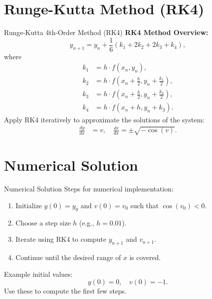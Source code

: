 \documentclass[aspectratio=43]{beamer}
\begin{document}
\section{Runge-Kutta Method (RK4)}
\begin{frame}{Runge-Kutta 4th-Order Method (RK4)}
    \textbf{RK4 Method Overview:}
    \[
    y_{n+1} = y_n + \frac{1}{6}\left(k_1 + 2k_2 + 2k_3 + k_4\right),
    \]
    where
    \begin{align*}
        k_1 &= h \cdot f(x_n, y_n), \\
        k_2 &= h \cdot f\left(x_n + \frac{h}{2}, y_n + \frac{k_1}{2}\right), \\
        k_3 &= h \cdot f\left(x_n + \frac{h}{2}, y_n + \frac{k_2}{2}\right), \\
        k_4 &= h \cdot f(x_n + h, y_n + k_3).
    \end{align*}
    \pause
    Apply RK4 iteratively to approximate the solutions of the system:
    \begin{align*}
        \frac{dy}{dx} &= v, \quad \frac{dv}{dx} = \pm \sqrt{-\cos(v)}.
    \end{align*}
\end{frame}

\section{Numerical Solution}
\begin{frame}{Numerical Solution}
    Steps for numerical implementation:
    \begin{enumerate}
        \item Initialize \( y(0) = y_0 \) and \( v(0) = v_0 \) such that \( \cos(v_0) < 0 \).
        \item Choose a step size \( h \) (e.g., \( h = 0.01 \)).
        \item Iterate using RK4 to compute \( y_{n+1} \) and \( v_{n+1} \).
        \item Continue until the desired range of \( x \) is covered.
    \end{enumerate}
    \pause
    Example initial values:
    \[
    y(0) = 0, \quad v(0) = -1.
    \]
    Use these to compute the first few steps.
\end{frame}

\end{document}
